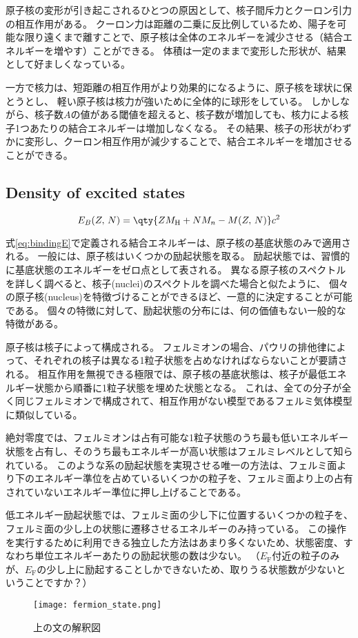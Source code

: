 \documentclass[a4paper,11pt,titlepage,uplatex]{jsarticle}
\begin{document}
原子核の変形が引き起こされるひとつの原因として、核子間斥力とクーロン引力の相互作用がある。
クーロン力は距離の二乗に反比例しているため、陽子を可能な限り遠くまで離すことで、原子核は全体のエネルギーを減少させる（結合エネルギーを増やす）ことができる。
体積は一定のままで変形した形状が、結果として好ましくなっている。

一方で核力は、短距離の相互作用がより効果的になるように、原子核を球状に保とうとし、
軽い原子核は核力が強いために全体的に球形をしている。
しかしながら、核子数$A$の値がある閾値を超えると、核子数が増加しても、核力による核子1つあたりの結合エネルギーは増加しなくなる。
その結果、核子の形状がわずかに変形し、クーロン相互作用が減少することで、結合エネルギーを増加させることができる。

\subsection{Density of excited states}
\begin{equation}
	E_B(Z,\,N) = \qty{ZM_{\text{H}} + NM_n -M(Z,\,N)}c^2
	\label{eq:bindingE}
\end{equation}

式\eqref{eq:bindingE}で定義される結合エネルギーは、原子核の基底状態のみで適用される。
一般には、原子核はいくつかの励起状態を取る。
励起状態では、習慣的に基底状態のエネルギーをゼロ点として表される。
異なる原子核のスペクトルを詳しく調べると、核子(nuclei)のスペクトルを調べた場合と似たように、
個々の原子核(nucleus)を特徴づけることができるほど、一意的に決定することが可能である。
個々の特徴に対して、励起状態の分布には、何の価値もない一般的な特徴がある。

原子核は核子によって構成される。
フェルミオンの場合、パウリの排他律によって、それぞれの核子は異なる1粒子状態を占めなければならないことが要請される。
相互作用を無視できる極限では、原子核の基底状態は、核子が最低エネルギー状態から順番に1粒子状態を埋めた状態となる。
これは、全ての分子が全く同じフェルミオンで構成されて、相互作用がない模型であるフェルミ気体模型に類似している。

絶対零度では、フェルミオンは占有可能な1粒子状態のうち最も低いエネルギー状態を占有し、そのうち最もエネルギーが高い状態はフェルミレベルとして知られている。
このような系の励起状態を実現させる唯一の方法は、フェルミ面より下のエネルギー準位を占めているいくつかの粒子を、フェルミ面より上の占有されていないエネルギー準位に押し上げることである。

低エネルギー励起状態では、フェルミ面の少し下に位置するいくつかの粒子を、フェルミ面の少し上の状態に遷移させるエネルギーのみ持っている。
この操作を実行するために利用できる独立した方法はあまり多くないため、状態密度、すなわち単位エネルギーあたりの励起状態の数は少ない。
（$E_{\text{F}}$付近の粒子のみが、$E_{\text{F}}$の少し上に励起することしかできないため、取りうる状態数が少ないということですか？）
\begin{figure}[H]
	\centering
	\texttt{[image: fermion\_state.png]}
	\caption{上の文の解釈図}
	\label{fig:fermion_state}
\end{figure}
\end{document}

